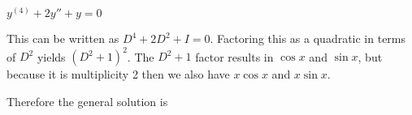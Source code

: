 $y^{(4)} + 2y'' + y = 0$

\soln This can be written as $D^4 + 2D^2 + I = 0$. Factoring this as a quadratic in terms of $D^2$ yields $(D^2 + 1)^2$. The $D^2 +1$ factor results in $\cos x$ and $\sin x$, but because it is multiplicity 2 then we also have $x \cos x$ and $x \sin x$. 

\nl Therefore the general solution is 

